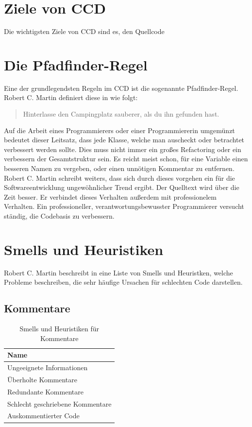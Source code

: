 \section{Ziele von CCD}
\SuperPar Die wichtigsten Ziele von CCD sind es, den Quellcode 

\section{Die Pfadfinder-Regel}
\SuperPar Eine der grundlegendsten Regeln im CCD ist die sogenannte Pfadfinder-Regel. Robert C. Martin definiert diese in \cite{CleanCode} wie folgt:

\begin{quote}
	Hinterlasse den Campingplatz sauberer, als du ihn gefunden hast.
\end{quote}

\SuperPar Auf die Arbeit eines Programmierers oder einer Programmiererin umgemünzt bedeutet dieser Leitsatz, dass jede Klasse, welche man auscheckt oder betrachtet verbessert werden sollte. Dies muss nicht immer ein großes Refactoring oder ein verbessern der Gesamtstruktur sein. Es reicht meist schon, für eine Variable einen besseren Namen zu vergeben, oder einen unnötigen Kommentar zu entfernen. Robert C. Martin schreibt weiters, dass sich durch dieses vorgehen ein für die Softwareentwicklung ungewöhnlicher Trend ergibt. Der Quelltext wird über die Zeit besser. Er verbindet dieses Verhalten außerdem mit professionelem Verhalten. Ein professioneller, verantwortungsbewusster Programmierer versucht ständig, die Codebasis zu verbessern.

\section{Smells und Heuristiken}
\SuperPar Robert C. Martin beschreibt in \cite{CleanCode} eine Liste von Smells und Heuristken, welche Probleme beschreiben, die sehr häufige Ursachen für schlechten Code darstellen.
\subsection{Kommentare}

\begin{table}[h]
	\centering
		 \begin{tabular}{ | l | }
		 \hline
			Name \\  \hline
			Ungeeignete Informationen\\
			Überholte Kommentare  \\
			Redundante Kommentare \\
			Schlecht geschriebene Kommentare  \\
			Auskommentierter Code \\ \hline
		\end{tabular}
	\caption{Smells und Heuristiken für Kommentare}
	\label{tab:SmellsUndHeuristiken_Comments}
\end{table}

